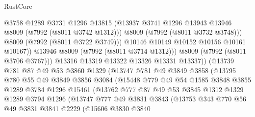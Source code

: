 \begin{lexlean}{RustCore}
\begin{coremodule}
                              @3758
                              @1289
                              @3731
                              @1296
                              @13815
                              (@13937 @3741 @1296 @13943 @13946 @8009 (@7992 (@8011 @3742 @1312)))
                              @8009
                              (@7992 (@8011 @3732 @3748)))
                            @8009
                            (@7992 (@8011 @3722 @3749)))
                          @10146
                          @10149
                          @10152
                          @10156
                          @10161
                          @10167))
                      @13946
                      @8009
                      (@7992 (@8011 @3714 @1312)))
                    @8009
                    (@7992 (@8011 @3706 @3767)))
                  @13316
                  @13319
                  @13322
                  @13326
                  @13331
                  @13337))
              (@13739
                @781
                @87
                @49
                @53
                @3860
                @1329
                (@13747
                  @781
                  @49
                  @3849
                  @3858
                  (@13795
                    @780
                    @55
                    @49
                    @3849
                    @3856
                    @3084
                    (@15448
                      @779
                      @49
                      @54
                      @1585
                      @3848
                      @3855
                      @1289
                      @3784
                      @1296
                      @15461
                      (@13762
                        @777
                        @87
                        @49
                        @53
                        @3845
                        @1312
                        @1329
                        @1289
                        @3794
                        @1296
                        (@13747
                          @777
                          @49
                          @3831
                          @3843
                          (@13753
                            @343
                            @770
                            @56
                            @49
                            @3831
                            @3841
                            @2229
                            (@15606
                              @3830
                              @3840

\end{coremodule}
\end{lexlean}
